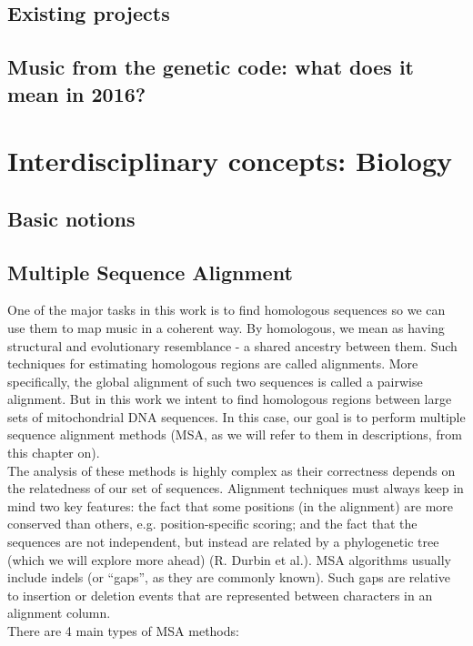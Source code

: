\documentclass[11pt,twoside,a4paper]{report}
\begin{document}
\subsection{Existing projects}
\subsection{Music from the genetic code: what does it mean in 2016?}

\section{Interdisciplinary concepts: Biology}
\subsection{Basic notions}
\subsection{Multiple Sequence Alignment}
One of the major tasks in this work is to find homologous sequences so we can use them to map music in a coherent way. By homologous, we mean as having structural and evolutionary resemblance - a shared ancestry between them. \cite[chapter, p.~215]{biodurbin} Such techniques for estimating homologous regions are called alignments. More specifically, the global alignment of such two sequences is called a pairwise alignment. But in this work we intent to find homologous regions between large sets of mitochondrial DNA sequences. In this case, our goal is to perform multiple sequence alignment methods (MSA, as we will refer to them in descriptions, from this chapter on).\\
The analysis of these methods is highly complex as their correctness depends on the relatedness of our set of sequences. Alignment techniques must always keep in mind two key features: the fact that some positions (in the alignment) are more conserved than others, e.g. position-specific scoring; and the fact that the sequences are not independent, but instead are related by a phylogenetic tree (which we will explore more ahead) (R. Durbin et al.). MSA algorithms usually include indels (or ``gaps'', as they are commonly known). Such gaps are relative to insertion or deletion events that are represented between characters in an alignment column.\\
There are 4 main types of MSA methods:
\end{document}
